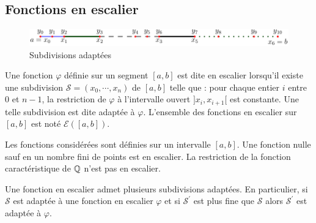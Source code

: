 \subsection{Fonctions en escalier}
\begin{figure}[h!]
 \centering
 \includegraphics{C2189_1.pdf}
 \caption{Subdivisions adaptées}
 \label{fig:C2189_1}
\end{figure}
\begin{defi}
 Une fonction $\varphi$ définie sur un segment $[a,b]$ est dite en escalier lorsqu'il existe une subdivision $\mathcal S = (x_0,\cdots,x_n)$ de $[a,b]$ telle que : pour chaque entier $i$ entre $0$ et $n-1$, la restriction de $\varphi$ à l'intervalle ouvert $]x_i,x_{i+1}[$ est constante.\newline
Une telle subdivision est dite adaptée à $\varphi$.\newline
L'ensemble des fonctions en escalier sur $[a,b]$ est noté $\mathcal E ([a,b])$.
\end{defi}
\begin{exples} 
Les fonctions considérées sont définies sur un intervalle $[a,b]$. \newline
Une fonction nulle sauf en un nombre fini de points est en escalier.\newline
La restriction de la fonction caractéristique de $\mathbb{Q}$ n'est pas en escalier. 
\end{exples}

\begin{rem}
 Une fonction en escalier admet plusieurs subdivisions adaptées. En particulier, si $\mathcal S$ est adaptée à une fonction en escalier $\varphi$ et si $\mathcal S^\prime$ est plus fine que $\mathcal S$ alors $\mathcal S^\prime$ est adaptée à $\varphi$.
\end{rem}

